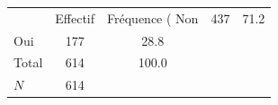 {
\def\sym#1{\ifmmode^{#1}\else\(^{#1}\)\fi}
\begin{tabular}{l*{1}{cc}}
\toprule
            &    Effectif&Fréquence (%
\midrule
Non         &         437&        71.2\\
Oui         &         177&        28.8\\
Total       &         614&       100.0\\
\midrule
\(N\)       &         614&            \\
\bottomrule
\end{tabular}
}
